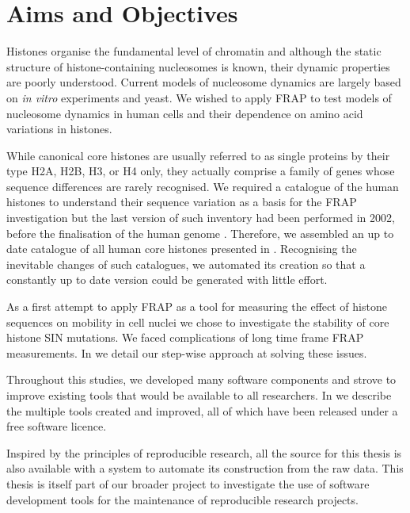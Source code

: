 
\section{Aims and Objectives}

  Histones organise the fundamental level of chromatin and
  although the static structure of histone-containing nucleosomes is
  known, their dynamic properties are poorly understood.  Current
  models of nucleosome dynamics are largely based on \textit{in vitro}
  experiments and yeast.  We wished to apply FRAP to test
  models of nucleosome dynamics in human cells and their dependence on
  amino acid variations in histones.

  While canonical core histones are usually referred to as single
  proteins by their type H2A, H2B,
  H3, or H4 only, they actually comprise a family of genes whose
  sequence differences are rarely recognised.
  We required a catalogue of the human histones to understand their
  sequence variation as a basis for the FRAP investigation
  but the last version of such inventory had been performed in
  2002, before the finalisation of the human genome \citep{Marzluff02}.
  Therefore, we assembled an up to
  date catalogue of all human core histones presented in
  .  Recognising the inevitable
  changes of such catalogues, we automated its creation so that a
  constantly up to date version could be generated with little effort.

  As a first attempt to apply FRAP as a tool for measuring the effect of
  histone sequences on mobility in cell nuclei we chose to investigate
  the stability of core histone SIN mutations.
  We faced complications
  of long time frame FRAP measurements.  In  we detail our
  step-wise approach at solving these issues.

  Throughout this studies, we developed many software components and
  strove to improve existing tools that would be available to all
  researchers.  In  we describe the multiple tools
  created and improved, all of which have been released under a free
  software licence.

  Inspired by the principles of reproducible research, all the source
  for this thesis is also available with a system to automate its
  construction from the raw data.  This thesis is itself part of our
  broader project to investigate
  the use of software development tools for the maintenance of
  reproducible research projects.
